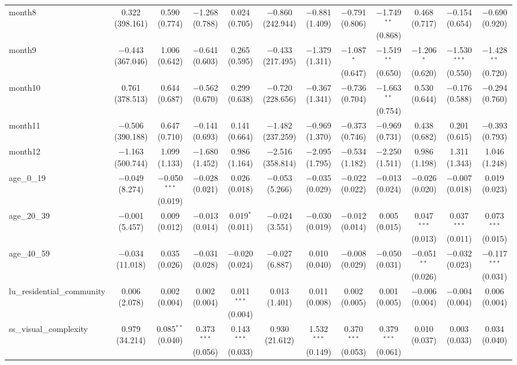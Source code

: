\begin{table}[!htbp]
\begin{tabular}{@{\extracolsep{1pt}}lccccccccccc}
  month8 & 0.322 (398.161) & 0.590 (0.774) & $-$1.268 (0.788) & 0.024 (0.705) & $-$0.860 (242.944) & $-$0.881 (1.409) & $-$0.791 (0.806) & $-$1.749$^{**}$ (0.868) & 0.468 (0.717) & $-$0.154 (0.654) & $-$0.690 (0.920) \\ 
  month9 & $-$0.443 (367.046) & 1.006 (0.642) & $-$0.641 (0.603) & 0.265 (0.595) & $-$0.433 (217.495) & $-$1.379 (1.311) & $-$1.087$^{*}$ (0.647) & $-$1.519$^{**}$ (0.650) & $-$1.206$^{*}$ (0.620) & $-$1.530$^{***}$ (0.550) & $-$1.428$^{**}$ (0.720) \\ 
  month10 & 0.761 (378.513) & 0.644 (0.687) & $-$0.562 (0.670) & 0.299 (0.638) & $-$0.720 (228.656) & $-$0.367 (1.341) & $-$0.736 (0.704) & $-$1.663$^{**}$ (0.754) & 0.530 (0.644) & $-$0.176 (0.588) & $-$0.294 (0.760) \\ 
  month11 & $-$0.506 (390.188) & 0.647 (0.710) & $-$0.141 (0.693) & 0.141 (0.664) & $-$1.482 (237.259) & $-$0.969 (1.370) & $-$0.373 (0.746) & $-$0.969 (0.731) & 0.438 (0.682) & 0.201 (0.615) & $-$0.393 (0.793) \\ 
  month12 & $-$1.163 (500.744) & 1.099 (1.133) & $-$1.680 (1.452) & 0.986 (1.164) & $-$2.516 (358.814) & $-$2.095 (1.795) & $-$0.534 (1.182) & $-$2.250 (1.511) & 0.986 (1.198) & 1.311 (1.343) & 1.046 (1.248) \\ 
  age\_0\_19 & $-$0.049 (8.274) & $-$0.050$^{***}$ (0.019) & $-$0.028 (0.021) & 0.026 (0.018) & $-$0.053 (5.266) & $-$0.035 (0.029) & $-$0.022 (0.022) & $-$0.013 (0.024) & $-$0.026 (0.020) & $-$0.007 (0.018) & 0.019 (0.023) \\ 
  age\_20\_39 & $-$0.001 (5.457) & 0.009 (0.012) & $-$0.013 (0.014) & 0.019$^{*}$ (0.011) & $-$0.024 (3.551) & $-$0.030 (0.019) & $-$0.012 (0.014) & 0.005 (0.015) & 0.047$^{***}$ (0.013) & 0.037$^{***}$ (0.011) & 0.073$^{***}$ (0.015) \\ 
  age\_40\_59 & $-$0.034 (11.018) & 0.035 (0.026) & $-$0.031 (0.028) & $-$0.020 (0.024) & $-$0.027 (6.887) & 0.010 (0.040) & $-$0.008 (0.029) & $-$0.050 (0.031) & $-$0.051$^{**}$ (0.026) & $-$0.032 (0.023) & $-$0.117$^{***}$ (0.031) \\ 
  lu\_residential\_community & 0.006 (2.078) & 0.002 (0.004) & 0.002 (0.004) & 0.011$^{***}$ (0.004) & 0.013 (1.401) & 0.011 (0.008) & 0.002 (0.005) & 0.001 (0.005) & $-$0.006 (0.004) & $-$0.004 (0.004) & 0.006 (0.004) \\ 
  ss\_visual\_complexity & 0.979 (34.214) & 0.085$^{**}$ (0.040) & 0.373$^{***}$ (0.056) & 0.143$^{***}$ (0.033) & 0.930 (21.612) & 1.532$^{***}$ (0.149) & 0.370$^{***}$ (0.053) & 0.379$^{***}$ (0.061) & 0.010 (0.037) & 0.003 (0.033) & 0.034 (0.040) \\ 

\end{tabular}
\end{table}
